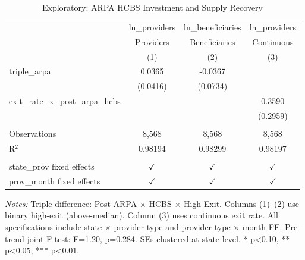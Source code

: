 
\begin{table}[htbp]
   \caption{\label{tab:ddd} Exploratory: ARPA HCBS Investment and Supply Recovery}
   \bigskip
   \centering
   \begin{tabular}{lccc}
      \toprule
                                           & ln\_providers  & ln\_beneficiaries  & ln\_providers\\   
                                           & Providers      & Beneficiaries      & Continuous \\   
                                           & (1)            & (2)                & (3)\\  
      \midrule 
      triple\_arpa                         & 0.0365         & -0.0367            &   \\   
                                           & (0.0416)       & (0.0734)           &   \\   
      exit\_rate\_x\_post\_arpa\_hcbs      &                &                    & 0.3590\\   
                                           &                &                    & (0.2959)\\   
       \\
      Observations                         & 8,568          & 8,568              & 8,568\\  
      R$^2$                                & 0.98194        & 0.98299            & 0.98197\\  
       \\
      state\_prov fixed effects            & $\checkmark$   & $\checkmark$       & $\checkmark$\\   
      prov\_month fixed effects            & $\checkmark$   & $\checkmark$       & $\checkmark$\\   
      \bottomrule
   \end{tabular}
   
   \par \raggedright 
   \textit{Notes:} Triple-difference: Post-ARPA $\times$ HCBS $\times$ High-Exit. Columns (1)--(2) use binary high-exit (above-median). Column (3) uses continuous exit rate. All specifications include state $\times$ provider-type and provider-type $\times$ month FE. Pre-trend joint F-test: F=1.20, p=0.284. SEs clustered at state level. * p<0.10, ** p<0.05, *** p<0.01.
\end{table}


